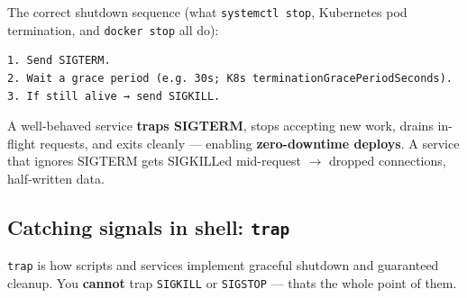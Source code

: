 \documentclass[11pt]{article}
\newenvironment{Shaded}{\begin{snugshade}}{\end{snugshade}}
\newcommand{\AttributeTok}[1]{\textcolor[rgb]{0.16,0.50,0.73}{#1}}
\newcommand{\BuiltInTok}[1]{\textcolor[rgb]{0.50,0.55,0.55}{#1}}
\newcommand{\CommentTok}[1]{\textcolor[rgb]{0.48,0.49,0.49}{#1}}
\newcommand{\DecValTok}[1]{\textcolor[rgb]{0.96,0.45,0.00}{#1}}
\newcommand{\ExtensionTok}[1]{\textcolor[rgb]{0.00,0.60,1.00}{\textbf{#1}}}
\newcommand{\FunctionTok}[1]{\textcolor[rgb]{0.56,0.27,0.68}{#1}}
\newcommand{\KeywordTok}[1]{\textcolor[rgb]{0.81,0.81,0.76}{\textbf{#1}}}
\newcommand{\NormalTok}[1]{\textcolor[rgb]{0.81,0.81,0.76}{#1}}
\newcommand{\OperatorTok}[1]{\textcolor[rgb]{0.81,0.81,0.76}{#1}}
\newcommand{\StringTok}[1]{\textcolor[rgb]{0.96,0.31,0.31}{#1}}
\newcommand{\VariableTok}[1]{\textcolor[rgb]{0.15,0.68,0.68}{#1}}
\begin{document}
The correct shutdown sequence (what \texttt{systemctl\ stop}, Kubernetes pod termination, and \texttt{docker\ stop} all do):

\setcodelang{}

\begin{verbatim}
1. Send SIGTERM.
2. Wait a grace period (e.g. 30s; K8s terminationGracePeriodSeconds).
3. If still alive → send SIGKILL.
\end{verbatim}

A well-behaved service \textbf{traps SIGTERM}, stops accepting new work, drains in-flight requests, and exits cleanly --- enabling \textbf{zero-downtime deploys}. A service that ignores SIGTERM gets SIGKILLed mid-request \(\rightarrow\) dropped connections, half-written data.

\subsection{\texorpdfstring{Catching signals in shell: \texttt{trap}}{Catching signals in shell: trap}}\label{catching-signals-in-shell-trap}


\begin{Shaded}
\end{Shaded}

\texttt{trap} is how scripts and services implement graceful shutdown and guaranteed cleanup. You \textbf{cannot} trap \texttt{SIGKILL} or \texttt{SIGSTOP} --- that\textquotesingle s the whole point of them.
\end{document}
